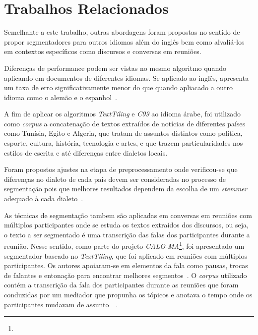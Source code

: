 \section{Trabalhos Relacionados}
	\label{sec:trabalhos}


Semelhante a este trabalho, outras abordagens foram propostas no sentido de propor segmentadores para outros idiomas além do inglês bem como alvaliá-los em contextos específicos como discursos e conversas em reuniões.

Diferenças de performance podem ser vistas no mesmo algoritmo quando aplicando em documentos de diferentes idiomas. Se aplicado ao inglês, apresenta um taxa de erro significativamente menor do que quando apliacado a outro idioma como o alemão e o espanhol~\cite{Kern2009}.

A fim de aplicar os algoritmos \textit{TextTiling} e \textit{C99} ao idioma árabe, foi utilizado como \textit{corpus} a concatenação de textos extraídos de notícias de diferentes países como Tunísia, Egito e Algeria, que tratam de assuntos distintos como política, esporte, cultura, história, tecnologia e artes, e que trazem particularidades nos estilos de escrita e até diferenças entre dialetos locais. 

Foram propostos ajustes na etapa de preprocessamento onde verificou-se que diferenças no dialeto de cada pais devem ser consideradas no processo de segmentação pois que melhores resultados dependem da escolha de um \textit{stemmer} adequado à cada dialeto~\cite{CHAIBI2014}.


As técnicas de segmentação tambem são aplicadas em conversas em reuniões com múltiplos participantes onde se estuda os textos extraídos dos discursos, ou seja, o texto a ser segmentado é uma transcrição das falas dos participantes durante a reunião.
Nesse sentido, como parte do projeto \textit{CALO-MA}\footnote{\urlcaloproject}, foi apresentado um segmentador baseado no  \textit{TextTiling}, que foi aplicado em reuniões com múltiplos participantes. Os autores apoiaram-se em elementos da fala como pausas, trocas de falantes e entonação para encontrar melhores segmentos~\cite{Galley2003}. O \textit{corpus} utilizado contém a transcrição da fala dos participantes durante as reuniões que foram conduzidas por um mediador que propunha os tópicos e anotava o tempo onde os participantes mudavam de assunto~\cite{Banerjee2006}~\cite{Tur2010}. 


